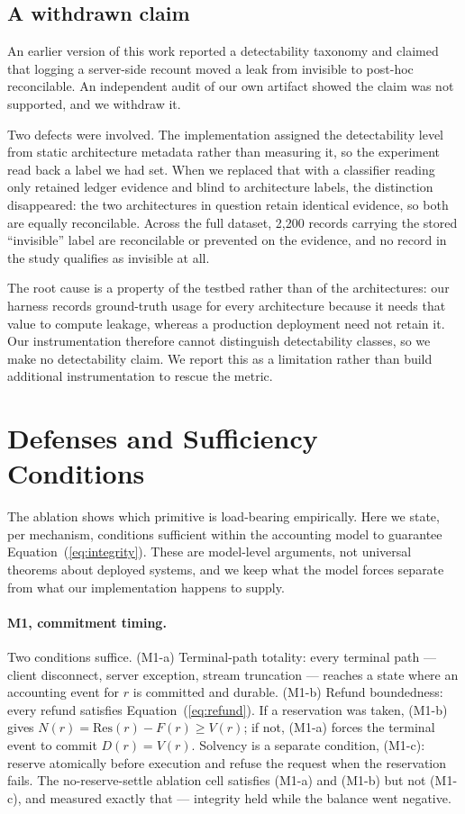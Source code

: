 \documentclass[preprint,3p,authoryear,12pt]{elsarticle}
\begin{document}
\subsection{A withdrawn claim}
\label{sec:detect}
An earlier version of this work reported a detectability taxonomy and claimed that
logging a server-side recount moved a leak from invisible to post-hoc reconcilable. An
independent audit of our own artifact showed the claim was not supported, and we
withdraw it.

Two defects were involved. The implementation assigned the detectability level from
static architecture metadata rather than measuring it, so the experiment read back a
label we had set. When we replaced that with a classifier reading only retained ledger
evidence and blind to architecture labels, the distinction disappeared: the two
architectures in question retain identical evidence, so both are equally reconcilable.
Across the full dataset, 2{,}200 records carrying the stored ``invisible'' label are
reconcilable or prevented on the evidence, and no record in the study qualifies as
invisible at all.

The root cause is a property of the testbed rather than of the architectures: our
harness records ground-truth usage for every architecture because it needs that value to
compute leakage, whereas a production deployment need not retain it. Our instrumentation
therefore cannot distinguish detectability classes, so we make no detectability claim. We
report this as a limitation rather than build additional instrumentation to rescue the
metric.

\section{Defenses and Sufficiency Conditions}
\label{sec:sufficiency}
The ablation shows which primitive is load-bearing empirically. Here we state, per
mechanism, conditions sufficient within the accounting model to guarantee
Equation~(\ref{eq:integrity}). These are model-level arguments, not universal theorems
about deployed systems, and we keep what the model forces separate from what our
implementation happens to supply.

\paragraph{M1, commitment timing.}
Two conditions suffice. (M1-a) Terminal-path totality: every terminal path --- client
disconnect, server exception, stream truncation --- reaches a state where an accounting
event for $r$ is committed and durable. (M1-b) Refund boundedness: every refund satisfies
Equation~(\ref{eq:refund}). If a reservation was taken, (M1-b) gives $N(r) =
\mathrm{Res}(r) - F(r) \ge V(r)$; if not, (M1-a) forces the terminal event to commit
$D(r) = V(r)$. Solvency is a separate condition, (M1-c): reserve atomically before
execution and refuse the request when the reservation fails. The no-reserve-settle
ablation cell satisfies (M1-a) and (M1-b) but not (M1-c), and measured exactly that ---
integrity held while the balance went negative.
\end{document}
